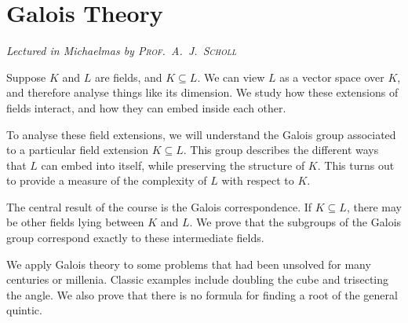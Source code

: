 \chapter[Galois Theory \\ \textnormal{\emph{Lectured in Michaelmas \oldstylenums{2022} by \textsc{Prof.\ A.\ J.\ Scholl}}}]{Galois Theory}
\emph{\Large Lectured in Michaelmas  by \textsc{Prof.\ A.\ J.\ Scholl}}

Suppose \( K \) and \( L \) are fields, and \( K \subseteq L \).
We can view \( L \) as a vector space over \( K \), and therefore analyse things like its dimension.
We study how these extensions of fields interact, and how they can embed inside each other.

To analyse these field extensions, we will understand the Galois group associated to a particular field extension \( K \subseteq L \).
This group describes the different ways that \( L \) can embed into itself, while preserving the structure of \( K \).
This turns out to provide a measure of the complexity of \( L \) with respect to \( K \).

The central result of the course is the Galois correspondence.
If \( K \subseteq L \), there may be other fields lying between \( K \) and \( L \).
We prove that the subgroups of the Galois group correspond exactly to these intermediate fields.

We apply Galois theory to some problems that had been unsolved for many centuries or millenia.
Classic examples include doubling the cube and trisecting the angle.
We also prove that there is no formula for finding a root of the general quintic.


